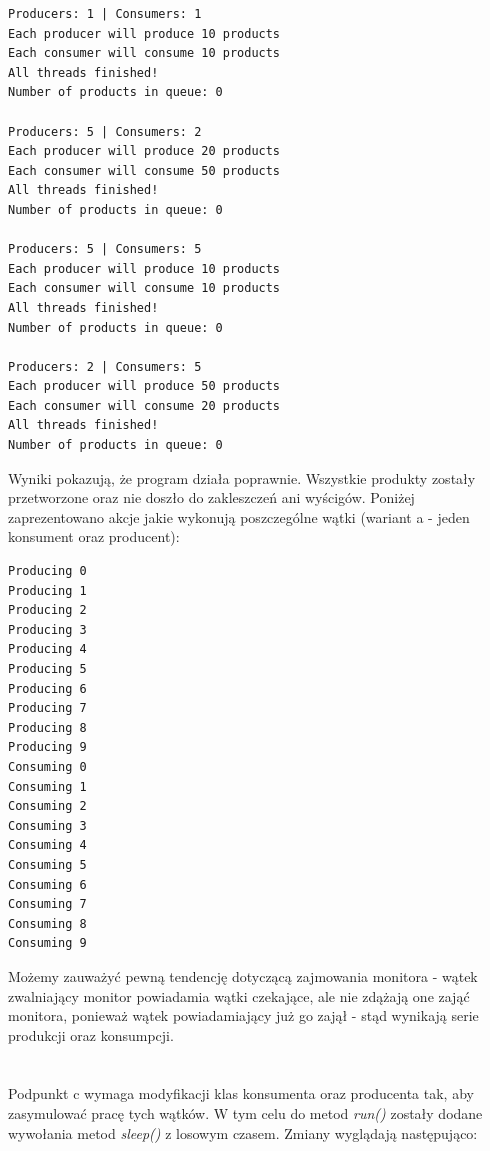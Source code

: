 \documentclass[12pt]{article}
\begin{document}
\begin{verbatim}
Producers: 1 | Consumers: 1
Each producer will produce 10 products
Each consumer will consume 10 products
All threads finished!
Number of products in queue: 0

Producers: 5 | Consumers: 2
Each producer will produce 20 products
Each consumer will consume 50 products
All threads finished!
Number of products in queue: 0

Producers: 5 | Consumers: 5
Each producer will produce 10 products
Each consumer will consume 10 products
All threads finished!
Number of products in queue: 0

Producers: 2 | Consumers: 5
Each producer will produce 50 products
Each consumer will consume 20 products
All threads finished!
Number of products in queue: 0
\end{verbatim}
\vspace{0.5cm}
Wyniki pokazują, że program działa poprawnie. Wszystkie produkty zostały przetworzone oraz nie doszło do zakleszczeń ani wyścigów. Poniżej zaprezentowano akcje jakie wykonują poszczególne wątki (wariant a - jeden konsument oraz producent):
\begin{verbatim}
Producing 0
Producing 1
Producing 2
Producing 3
Producing 4
Producing 5
Producing 6
Producing 7
Producing 8
Producing 9
Consuming 0
Consuming 1
Consuming 2
Consuming 3
Consuming 4
Consuming 5
Consuming 6
Consuming 7
Consuming 8
Consuming 9
\end{verbatim}
\vspace{0.5cm}
Możemy zauważyć pewną tendencję dotyczącą zajmowania monitora - wątek zwalniający monitor powiadamia wątki czekające, ale nie zdążają one zająć monitora, ponieważ wątek powiadamiający już go zajął - stąd wynikają serie produkcji oraz konsumpcji.
\\
\\
\\
Podpunkt c wymaga modyfikacji klas konsumenta oraz producenta tak, aby zasymulować pracę tych wątków. W tym celu do metod \emph{run()} zostały dodane wywołania metod \emph{sleep()} z losowym czasem. Zmiany wyglądają następująco:
\end{document}
